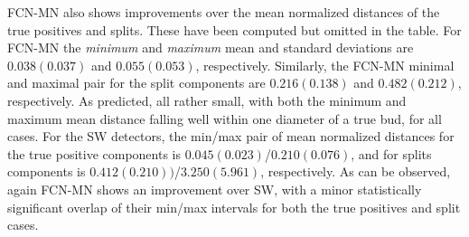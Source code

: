 \documentclass[a4paper,authoryear,review]{elsarticle}
\begin{document}
	
	FCN-MN also shows improvements over the mean normalized distances of the true positives and splits. These have been computed but omitted in the table. For FCN-MN the \emph{minimum} and \emph{maximum} mean and standard deviations are $0.038(0.037)$ and $0.055(0.053)$, respectively. Similarly, the FCN-MN minimal and maximal pair for the split components are $0.216(0.138)$ and $0.482(0.212)$, respectively. As predicted, all rather small, with both the minimum and maximum mean distance falling well within one diameter of a true bud, for all cases.
	For the SW detectors, the min/max pair of mean normalized distances for the true positive components is $0.045(0.023)$/$0.210(0.076)$, and for splits components is $0.412(0.210))$/$3.250(5.961)$, respectively. 
	As can be observed, again FCN-MN shows an improvement over SW, with a minor statistically significant overlap of their min/max intervals for both the true positives and split cases.
	
	
	
\end{document}

